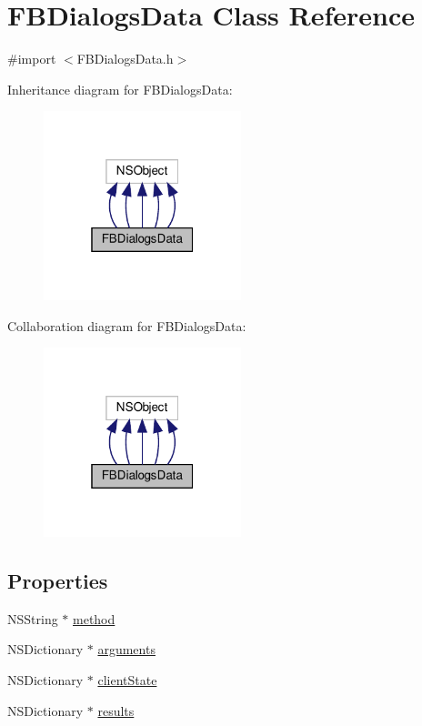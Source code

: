 \hypertarget{interfaceFBDialogsData}{}\section{F\+B\+Dialogs\+Data Class Reference}
\label{interfaceFBDialogsData}


{\ttfamily \#import $<$F\+B\+Dialogs\+Data.\+h$>$}



Inheritance diagram for F\+B\+Dialogs\+Data\+:
\nopagebreak
\begin{figure}[H]
\begin{center}
\leavevmode
\includegraphics[width=163pt]{interfaceFBDialogsData__inherit__graph}
\end{center}
\end{figure}


Collaboration diagram for F\+B\+Dialogs\+Data\+:
\nopagebreak
\begin{figure}[H]
\begin{center}
\leavevmode
\includegraphics[width=163pt]{interfaceFBDialogsData__coll__graph}
\end{center}
\end{figure}
\subsection*{Properties}
\begin{DoxyCompactItemize}
\item 
N\+S\+String $\ast$ \hyperlink{interfaceFBDialogsData_a4f43aa8789a85f189816638f3ae26d3d}{method}
\item 
N\+S\+Dictionary $\ast$ \hyperlink{interfaceFBDialogsData_a684b1d6b5e6e1ee3015d639228ed3078}{arguments}
\item 
N\+S\+Dictionary $\ast$ \hyperlink{interfaceFBDialogsData_a6de7147941c70c1f49913d983169c6ea}{client\+State}
\item 
N\+S\+Dictionary $\ast$ \hyperlink{interfaceFBDialogsData_acf7d8cf16ffae9acaed5aa1ad1161765}{results}
\end{DoxyCompactItemize}


